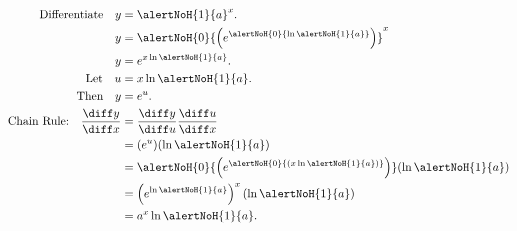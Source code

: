\begin{frame}
\begin{example}
\abovedisplayskip=0pt
\belowdisplayskip=0pt
\abovedisplayshortskip=0pt
\belowdisplayshortskip=0pt
\begin{align*}
\text{Differentiate}\quad y & = {\alertNoH{1}{a}}^x .\\
y & =  {\alertNoH{0}{ \left( e^{\alertNoH{0}{\ln {\alertNoH{1}{a}}}} \right)}} ^{x} \\
y & = e^{x\ln {\alertNoH{1}{a}}}.\\
\text{Let} \quad u &=  x\ln {\alertNoH{1}{a}}.\\
\text{Then} \quad y &=  e^{u}. \\
\text{Chain Rule:}\quad \frac{\diff y}{\diff x} &= \frac{\diff y}{\diff u}\frac{\diff u}{\diff x}\\
&= ( e^{u})(\ln {\alertNoH{1}{a}})\\
&=\alertNoH{0}{ \left(  e^{\alertNoH{0}{(x\ln \alertNoH{1}{a} )}}\right)} (\ln {\alertNoH{1}{a}})\\
&= \left( e^{\ln {\alertNoH{1}{a}}}\right)^x(\ln {\alertNoH{1}{a}})\\
&= a^x \ln {\alertNoH{1}{a}}.
\end{align*}
\end{example}
\end{frame}
